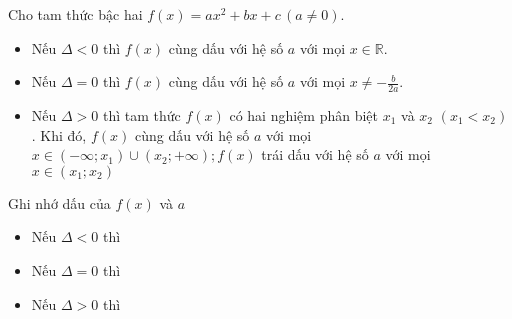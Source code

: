 \begin{center}
	\begin{minipage}{8cm}
		\begin{tcolorbox}[colframe=cyan,colback=cyan!3,boxrule=0.2mm]
			 Cho tam thức bậc hai $f(x)=ax^2+b x+c\,(a \neq 0)$.
			\begin{itemize}
				\item [\iconCH] Nếu $\Delta<0$ thì $f(x)$ cùng dấu với hệ số $a$ với mọi $x \in \mathbb{R}$.
				\item [\iconCH] Nếu $\Delta=0$ thì $f(x)$ cùng dấu với hệ số $a$ với mọi $x \neq-\frac{b}{2 a}$.
				\item [\iconCH] Nếu $\Delta>0$ thì tam thức $f(x)$ có hai nghiệm phân biệt $x_1$ và $x_2$ $\left(x_{1}<x_{2}\right)$. Khi đó, $f(x)$ cùng dấu với hệ số $a$ với mọi $x \in\left(-\infty ; x_{1}\right) \cup\left(x_{2} ;+\infty\right) ; f(x)$ trái dấu với hệ số $a$ với mọi $x \in\left(x_{1} ; x_{2}\right)$
			\end{itemize}
		\end{tcolorbox}
	\end{minipage}\hspace{0.5cm}
	\begin{minipage}{9cm}
		\begin{khung4}{Ghi nhớ dấu của $f(x)$ và $a$}
			\begin{itemize}
				\item[\iconCH] Nếu $\Delta < 0$ thì\\
				\item[\iconCH] Nếu $\Delta = 0$ thì\\
				\item[\iconCH] Nếu $\Delta > 0$ thì\\
			\end{itemize}
		\end{khung4}
	\end{minipage}
\end{center}


